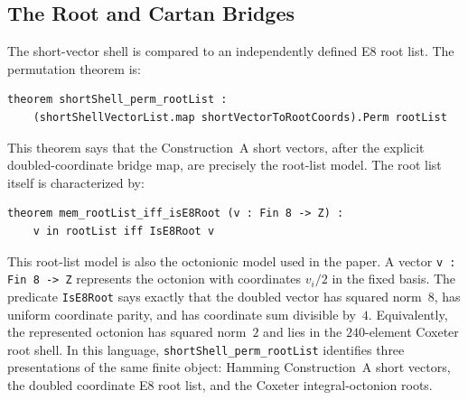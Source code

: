 \documentclass[12pt]{article}
\theoremstyle{definition}
\newcommand{\lean}[1]{\texttt{#1}}
\begin{document}
\subsection{The Root and Cartan Bridges}

The short-vector shell is compared to an independently defined E8 root list.
The permutation theorem is:
\begin{lstlisting}[style=lean]
theorem shortShell_perm_rootList :
    (shortShellVectorList.map shortVectorToRootCoords).Perm rootList
\end{lstlisting}
This theorem says that the Construction~A short vectors, after the explicit
doubled-coordinate bridge map, are precisely the root-list model.  The root
list itself is characterized by:
\begin{lstlisting}[style=lean]
theorem mem_rootList_iff_isE8Root (v : Fin 8 -> Z) :
    v in rootList iff IsE8Root v
\end{lstlisting}

This root-list model is also the octonionic model used in the paper.  A vector
\lean{v : Fin 8 -> Z} represents the octonion with coordinates
$v_i/2$ in the fixed basis.  The predicate \lean{IsE8Root} says exactly that
the doubled vector has squared norm~$8$, has uniform coordinate parity, and has
coordinate sum divisible by~$4$.  Equivalently, the represented octonion has
squared norm~$2$ and lies in the $240$-element Coxeter root shell.  In this
language, \lean{shortShell\_perm\_rootList} identifies three presentations of
the same finite object: Hamming Construction~A short vectors, the doubled
coordinate E8 root list, and the Coxeter integral-octonion roots.
\end{document}
